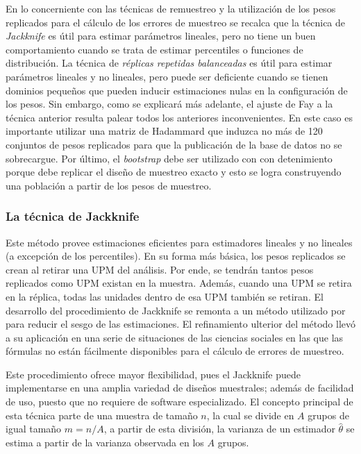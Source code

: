 \documentclass[
  12pt,
  spanish,
]{book}
\begin{document}
En lo concerniente con las técnicas de remuestreo y la utilización de los pesos replicados para el cálculo de los errores de muestreo se recalca que la técnica de \emph{Jackknife} es útil para estimar parámetros lineales, pero no tiene un buen comportamiento cuando se trata de estimar percentiles o funciones de distribución. La técnica de \emph{réplicas repetidas balanceadas} es útil para estimar parámetros lineales y no lineales, pero puede ser deficiente cuando se tienen dominios pequeños que pueden inducir estimaciones nulas en la configuración de los pesos. Sin embargo, como se explicará más adelante, el ajuste de Fay a la técnica anterior resulta palear todos los anteriores inconvenientes. En este caso es importante utilizar una matriz de Hadammard que induzca no más de 120 conjuntos de pesos replicados para que la publicación de la base de datos no se sobrecargue. Por último, el \emph{bootstrap} debe ser utilizado con con detenimiento porque debe replicar el diseño de muestreo exacto y esto se logra construyendo una población a partir de los pesos de muestreo.

\hypertarget{la-tuxe9cnica-de-jackknife}{%
\subsubsection*{La técnica de Jackknife}\label{la-tuxe9cnica-de-jackknife}}

Este método provee estimaciones eficientes para estimadores lineales y no lineales (a excepción de los percentiles). En su forma más básica, los pesos replicados se crean al retirar una UPM del análisis. Por ende, se tendrán tantos pesos replicados como UPM existan en la muestra. Además, cuando una UPM se retira en la réplica, todas las unidades dentro de esa UPM también se retiran. El desarrollo del procedimiento de Jackknife se remonta a un método utilizado por \citet{Quenouille} para reducir el sesgo de las estimaciones. El refinamiento ulterior del método \citep{mosteller1968data} llevó a su aplicación en una serie de situaciones de las ciencias sociales en las que las fórmulas no están fácilmente disponibles para el cálculo de errores de muestreo.

Este procedimiento ofrece mayor flexibilidad, pues el Jackknife puede implementarse en una amplia variedad de diseños muestrales; además de facilidad de uso, puesto que no requiere de software especializado. El concepto principal de esta técnica parte de una muestra de tamaño \(n\), la cual se divide en \(A\) grupos de igual tamaño \(m=n/A\), a partir de esta división, la varianza de un estimador \(\hat{\theta}\) se estima a partir de la varianza observada en los \(A\) grupos.
\end{document}
